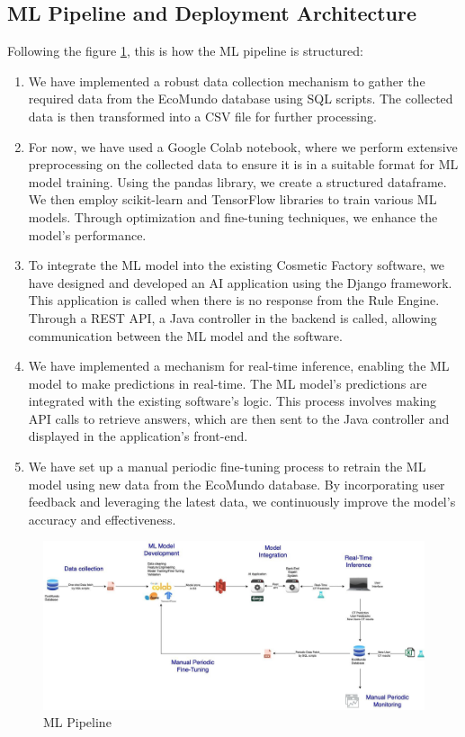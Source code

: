 \documentclass[a4paper,12pt,twoside]{report}
\begin{document}
\subsection{ML Pipeline and Deployment Architecture}

Following the figure \ref{ML Pipeline}, this is how the ML pipeline is structured:
\begin{enumerate}
\item We have implemented a robust data collection mechanism to gather the required data from the EcoMundo database using SQL scripts. The collected data is then transformed into a CSV file for further processing.
\item For now, we have used a Google Colab notebook, where we perform extensive preprocessing on the collected data to ensure it is in a suitable format for ML model training. Using the pandas library, we create a structured dataframe. We then employ scikit-learn and TensorFlow libraries to train various ML models. Through optimization and fine-tuning techniques, we enhance the model's performance.
\item To integrate the ML model into the existing Cosmetic Factory software, we have designed and developed an AI application using the Django framework. This application is called when there is no response from the Rule Engine. Through a REST API, a Java controller in the backend is called, allowing communication between the ML model and the software.
\item We have implemented a mechanism for real-time inference, enabling the ML model to make predictions in real-time. The ML model's predictions are integrated with the existing software's logic. This process involves making API calls to retrieve answers, which are then sent to the Java controller and displayed in the application's front-end.
\item We have set up a manual periodic fine-tuning process to retrain the ML model using new data from the EcoMundo database. By incorporating user feedback and leveraging the latest data, we continuously improve the model's accuracy and effectiveness.

\end{enumerate}
\begin{figure}[H]
		\includegraphics[width=\textwidth]{images/ctDeploy}
	\caption[ML Pipeline]{ML Pipeline}
\label{ML Pipeline}
\end{figure}
\end{document}
